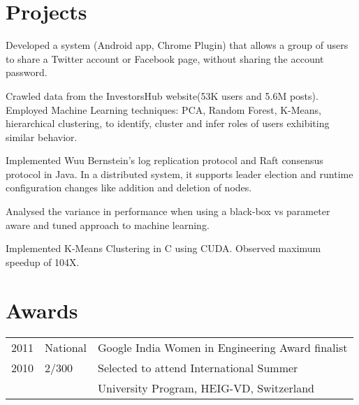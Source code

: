 \documentclass[]{deedy-resume-openfont}
\begin{document}
\begin{minipage}[t]{0.63\textwidth}
\section{Projects}
Developed a system (Android app, Chrome Plugin) that
allows
a
group
of
users
to
share
a
Twitter
account
or
Facebook
page,
without
sharing
the
account
password.
\sectionsep

 Crawled
data
from
the
InvestorsHub
website(53K users and 5.6M posts).
Employed
Machine
Learning
techniques:
PCA,
Random
Forest,
K-Means,
hierarchical
clustering,
to
identify,
cluster
and
infer
roles
of
users
exhibiting
similar
behavior.

\sectionsep

Implemented Wuu Bernstein’s log replication protocol and Raft consensus protocol in Java. In a distributed system, it supports leader election and runtime configuration changes like addition and deletion of nodes.
\sectionsep

Analysed the variance in performance when using a black-box vs parameter aware and tuned approach to machine learning. \sectionsep

Implemented K-Means Clustering in C using CUDA. Observed maximum speedup of 104X.

\section{Awards} 
\begin{tabular}{rll}
2011	     & National  & Google
India
Women
in
Engineering
Award finalist\\
2010 & 2/300 & Selected to attend International Summer\\  & & University Program, HEIG-VD, Switzerland\\
\end{tabular}

\end{minipage} 
\end{document}
